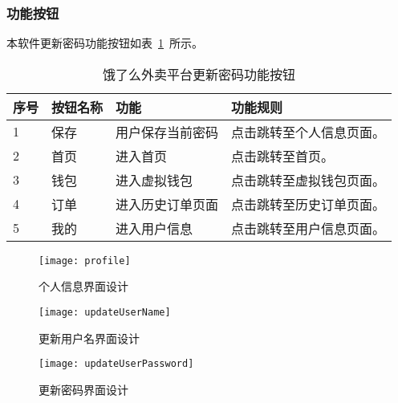 \subsubsection{功能按钮}
本软件更新密码功能按钮如表~\ref{tab:table18}~所示。
\begin{table}[htbp]
    \caption{饿了么外卖平台更新密码功能按钮}\label{tab:table18}
    \vspace{0.5em}\wuhao
    \begin{tabularx}{\textwidth}{lllX}
    \toprule[1.5pt]
    序号 & 按钮名称 & 功能 & 功能规则 \\ 
    \midrule[1pt]
    1 & 保存 & 用户保存当前密码 & 点击跳转至个人信息页面。 \\
    2 & 首页 & 进入首页 & 点击跳转至首页。 \\
    3 & 钱包 & 进入虚拟钱包 & 点击跳转至虚拟钱包页面。 \\
    4 & 订单 & 进入历史订单页面 & 点击跳转至历史订单页面。 \\
    5 & 我的 & 进入用户信息 & 点击跳转至用户信息页面。 \\
\bottomrule[1.5pt]
\end{tabularx}
\vspace{\baselineskip}
\end{table}
\begin{figure}[htbp]
    \centering
    \begin{minipage}{0.4\textwidth}
    \centering
    \texttt{[image: profile]}
    \caption{个人信息界面设计}\label{fig:profile}
    \end{minipage}
    \begin{minipage}{0.4\textwidth}
    \centering
    \texttt{[image: updateUserName]}
    \caption{更新用户名界面设计}\label{fig:updateUserName}
    \end{minipage}
    \vspace{\baselineskip}
\end{figure}
\begin{figure}[htbp]
    \centering
    \texttt{[image: updateUserPassword]}
    \caption{更新密码界面设计}\label{fig:updateUserPassword}
    \vspace{\baselineskip}
\end{figure}